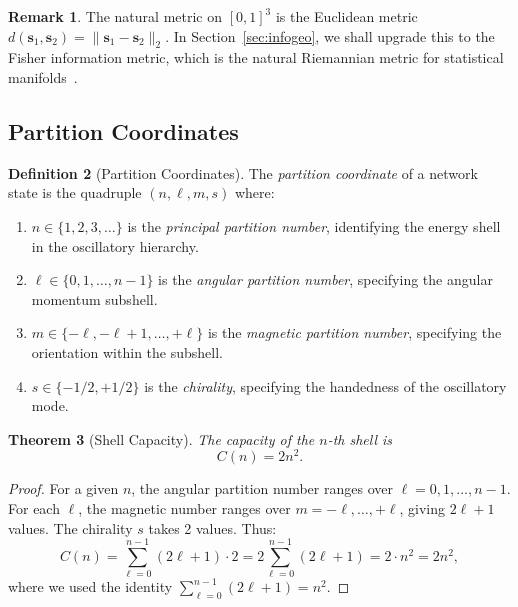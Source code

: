 \documentclass[11pt,twocolumn,a4paper]{article}
\newtheorem{theorem}{Theorem}[section]
\theoremstyle{definition}
\newtheorem{definition}[theorem]{Definition}
\newtheorem{remark}[theorem]{Remark}
\begin{document}
\begin{remark}\label{rem:sspace_metric}
The natural metric on $[0,1]^3$ is the Euclidean metric $d(\mathbf{s}_1, \mathbf{s}_2) =
\|\mathbf{s}_1 - \mathbf{s}_2\|_2$. In Section~\ref{sec:infogeo}, we shall upgrade this
to the Fisher information metric, which is the natural Riemannian metric for statistical
manifolds~\cite{amari1985,amari2000,fisher1925}.
\end{remark}

\subsection{Partition Coordinates}\label{sec:foundations:partition}

\begin{definition}[Partition Coordinates]\label{def:partition}
The \emph{partition coordinate} of a network state is the quadruple $(n, \ell, m, s)$ where:
\begin{enumerate}[label=(\alph*)]
  \item $n \in \{1, 2, 3, \ldots\}$ is the \emph{principal partition number}, identifying
        the energy shell in the oscillatory hierarchy.
  \item $\ell \in \{0, 1, \ldots, n-1\}$ is the \emph{angular partition number},
        specifying the angular momentum subshell.
  \item $m \in \{-\ell, -\ell+1, \ldots, +\ell\}$ is the \emph{magnetic partition number},
        specifying the orientation within the subshell.
  \item $s \in \{-1/2, +1/2\}$ is the \emph{chirality}, specifying the handedness of the
        oscillatory mode.
\end{enumerate}
\end{definition}

\begin{theorem}[Shell Capacity]\label{thm:shell_capacity}
The capacity of the $n$-th shell is
\begin{equation}\label{eq:shell_capacity}
  C(n) = 2n^2.
\end{equation}
\end{theorem}

\begin{proof}
For a given $n$, the angular partition number ranges over $\ell = 0, 1, \ldots, n-1$.
For each $\ell$, the magnetic number ranges over $m = -\ell, \ldots, +\ell$, giving
$2\ell + 1$ values. The chirality $s$ takes 2 values. Thus:
\begin{equation}
  C(n) = \sum_{\ell=0}^{n-1} (2\ell + 1) \cdot 2 = 2 \sum_{\ell=0}^{n-1}(2\ell+1)
       = 2 \cdot n^2 = 2n^2,
\end{equation}
where we used the identity $\sum_{\ell=0}^{n-1}(2\ell+1) = n^2$.
\end{proof}
\end{document}
